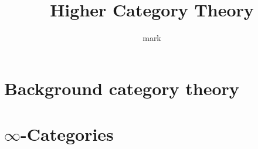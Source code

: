 \documentclass{article}
\title{Higher Category Theory}
\author{mark}
\begin{document}
\maketitle

\section{Background category theory}

\section{$\infty$-Categories}

\end{document}
